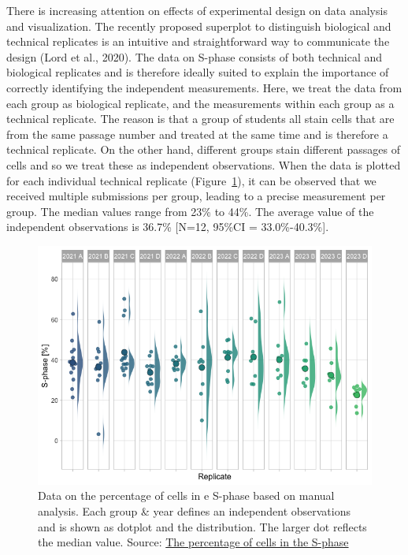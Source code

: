 \documentclass[
]{agujournal2019}
\begin{document}
There is increasing attention on effects of experimental design on data
analysis and visualization. The recently proposed superplot to
distinguish biological and technical replicates is an intuitive and
straightforward way to communicate the design (Lord et al., 2020). The
data on S-phase consists of both technical and biological replicates and
is therefore ideally suited to explain the importance of correctly
identifying the independent measurements. Here, we treat the data from
each group as biological replicate, and the measurements within each
group as a technical replicate. The reason is that a group of students
all stain cells that are from the same passage number and treated at the
same time and is therefore a technical replicate. On the other hand,
different groups stain different passages of cells and so we treat these
as independent observations. When the data is plotted for each
individual technical replicate (Figure~\ref{fig-superplot}), it can be
observed that we received multiple submissions per group, leading to a
precise measurement per group. The median values range from 23\% to
44\%. The average value of the independent observations is 36.7\%
{[}N=12, 95\%CI = 33.0\%-40.3\%{]}.

\begin{figure}[H]

{\centering \includegraphics{index_files/figure-latex/fig-superplot-output-2.png}

}

\caption{\label{fig-superplot}Data on the percentage of cells in e
S-phase based on manual analysis. Each group \& year defines an
independent observations and is shown as dotplot and the distribution.
The larger dot reflects the median value. Source:
\href{https://JoachimGoedhart.github.io/MS-StudentSourcing/notebooks/PreciSe-preview.html\#cell-fig-superplot}{The
percentage of cells in the S-phase}}

\end{figure}
\end{document}
